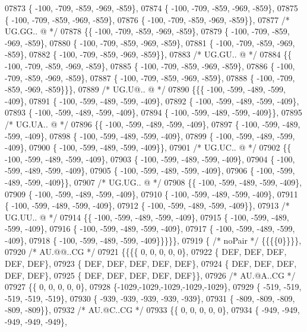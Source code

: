 \begin{DoxyCode}
07873 \{ -100, -709, -859, -969, -859\},
07874 \{ -100, -709, -859, -969, -859\},
07875 \{ -100, -709, -859, -969, -859\},
07876 \{ -100, -709, -859, -969, -859\}\},
07877 \textcolor{comment}{/* UG.GG.. @ */}
07878 \{\{ -100, -709, -859, -969, -859\},
07879 \{ -100, -709, -859, -969, -859\},
07880 \{ -100, -709, -859, -969, -859\},
07881 \{ -100, -709, -859, -969, -859\},
07882 \{ -100, -709, -859, -969, -859\}\},
07883 \textcolor{comment}{/* UG.GU.. @ */}
07884 \{\{ -100, -709, -859, -969, -859\},
07885 \{ -100, -709, -859, -969, -859\},
07886 \{ -100, -709, -859, -969, -859\},
07887 \{ -100, -709, -859, -969, -859\},
07888 \{ -100, -709, -859, -969, -859\}\}\},
07889 \textcolor{comment}{/* UG.U@.. @ */}
07890 \{\{\{ -100, -599, -489, -599, -409\},
07891 \{ -100, -599, -489, -599, -409\},
07892 \{ -100, -599, -489, -599, -409\},
07893 \{ -100, -599, -489, -599, -409\},
07894 \{ -100, -599, -489, -599, -409\}\},
07895 \textcolor{comment}{/* UG.UA.. @ */}
07896 \{\{ -100, -599, -489, -599, -409\},
07897 \{ -100, -599, -489, -599, -409\},
07898 \{ -100, -599, -489, -599, -409\},
07899 \{ -100, -599, -489, -599, -409\},
07900 \{ -100, -599, -489, -599, -409\}\},
07901 \textcolor{comment}{/* UG.UC.. @ */}
07902 \{\{ -100, -599, -489, -599, -409\},
07903 \{ -100, -599, -489, -599, -409\},
07904 \{ -100, -599, -489, -599, -409\},
07905 \{ -100, -599, -489, -599, -409\},
07906 \{ -100, -599, -489, -599, -409\}\},
07907 \textcolor{comment}{/* UG.UG.. @ */}
07908 \{\{ -100, -599, -489, -599, -409\},
07909 \{ -100, -599, -489, -599, -409\},
07910 \{ -100, -599, -489, -599, -409\},
07911 \{ -100, -599, -489, -599, -409\},
07912 \{ -100, -599, -489, -599, -409\}\},
07913 \textcolor{comment}{/* UG.UU.. @ */}
07914 \{\{ -100, -599, -489, -599, -409\},
07915 \{ -100, -599, -489, -599, -409\},
07916 \{ -100, -599, -489, -599, -409\},
07917 \{ -100, -599, -489, -599, -409\},
07918 \{ -100, -599, -489, -599, -409\}\}\}\}\},
07919 \{ \textcolor{comment}{/* noPair */} \{\{\{\{0\}\}\}\},
07920 \textcolor{comment}{/* AU.@@..CG */}
07921 \{\{\{\{    0,    0,    0,    0,    0\},
07922 \{  DEF,  DEF,  DEF,  DEF,  DEF\},
07923 \{  DEF,  DEF,  DEF,  DEF,  DEF\},
07924 \{  DEF,  DEF,  DEF,  DEF,  DEF\},
07925 \{  DEF,  DEF,  DEF,  DEF,  DEF\}\},
07926 \textcolor{comment}{/* AU.@A..CG */}
07927 \{\{    0,    0,    0,    0,    0\},
07928 \{-1029,-1029,-1029,-1029,-1029\},
07929 \{ -519, -519, -519, -519, -519\},
07930 \{ -939, -939, -939, -939, -939\},
07931 \{ -809, -809, -809, -809, -809\}\},
07932 \textcolor{comment}{/* AU.@C..CG */}
07933 \{\{    0,    0,    0,    0,    0\},
07934 \{ -949, -949, -949, -949, -949\},

\end{DoxyCode}
